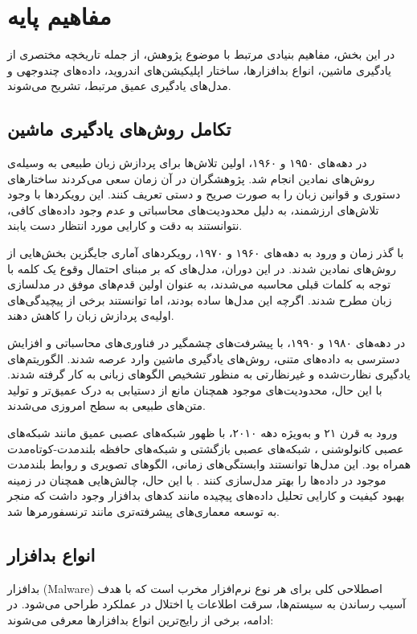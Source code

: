 \section{مفاهیم پایه}
در این بخش، مفاهیم بنیادی مرتبط با موضوع پژوهش، از جمله تاریخچه مختصری از یادگیری ماشین، انواع بدافزارها، ساختار اپلیکیشن‌های اندروید، داده‌های چندوجهی و مدل‌های یادگیری عمیق مرتبط، تشریح می‌شوند.

\subsection{تکامل روش‌های یادگیری ماشین}
در دهه‌های ۱۹۵۰ و ۱۹۶۰، اولین تلاش‌ها برای پردازش زبان طبیعی به وسیله‌ی روش‌های نمادین انجام شد. پژوهشگران در آن زمان سعی می‌کردند ساختارهای دستوری و قوانین زبان را به صورت صریح و دستی تعریف کنند. این رویکردها با وجود تلاش‌های ارزشمند، به دلیل محدودیت‌های محاسباتی و عدم وجود داده‌های کافی، نتوانستند به دقت و کارایی مورد انتظار دست یابند.

با گذر زمان و ورود به دهه‌های ۱۹۶۰ و ۱۹۷۰، رویکردهای آماری جایگزین بخش‌هایی از روش‌های نمادین شدند. در این دوران، مدل‌های  که بر مبنای احتمال وقوع یک کلمه با توجه به کلمات قبلی محاسبه می‌شدند، به عنوان اولین قدم‌های موفق در مدلسازی زبان مطرح شدند. اگرچه این مدل‌ها ساده بودند، اما توانستند برخی از پیچیدگی‌های اولیه‌ی پردازش زبان را کاهش دهند.

در دهه‌های ۱۹۸۰ و ۱۹۹۰، با پیشرفت‌های چشمگیر در فناوری‌های محاسباتی و افزایش دسترسی به داده‌های متنی، روش‌های یادگیری ماشین وارد عرصه شدند. الگوریتم‌های یادگیری نظارت‌شده و غیرنظارتی به منظور تشخیص الگوهای زبانی به کار گرفته شدند. با این حال، محدودیت‌های موجود همچنان مانع از دستیابی به درک عمیق‌تر و تولید متن‌های طبیعی به سطح امروزی می‌شدند.

ورود به قرن ۲۱ و به‌ویژه دهه ۲۰۱۰، با ظهور شبکه‌های عصبی عمیق مانند شبکه‌های عصبی کانولوشنی
، شبکه‌های عصبی بازگشتی
 و شبکه‌های حافظه بلندمدت-کوتاه‌مدت
  همراه بود. این مدل‌ها توانستند وابستگی‌های زمانی، الگوهای تصویری و روابط بلندمدت موجود در داده‌ها را بهتر مدل‌سازی کنند \cite{Vinayakumar2019}. با این حال، چالش‌هایی همچنان در زمینه بهبود کیفیت و کارایی تحلیل داده‌های پیچیده مانند کدهای بدافزار وجود داشت که منجر به توسعه معماری‌های پیشرفته‌تری مانند ترنسفورمرها شد.

\subsection{انواع بدافزار}
بدافزار (Malware) اصطلاحی کلی برای هر نوع نرم‌افزار مخرب است که با هدف آسیب رساندن به سیستم‌ها، سرقت اطلاعات یا اختلال در عملکرد طراحی می‌شود. در ادامه، برخی از رایج‌ترین انواع بدافزارها معرفی می‌شوند:

